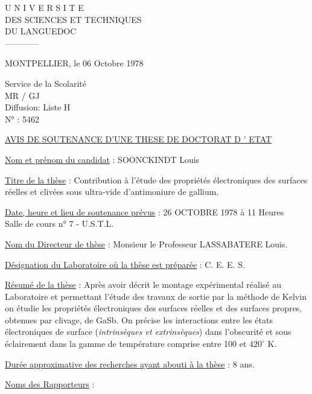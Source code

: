 
\begin{center}
U N I V E R S I T E\\
DES SCIENCES ET TECHNIQUES\\
DU LANGUEDOC\\
------------
\end{center}

MONTPELLIER, le 06 Octobre 1978

Service de la Scolarité\\
MR / GJ\\
Diffusion\quad : Liste H\\
N° : 5462

\begin{center}
\uline{AVIS DE SOUTENANCE D'UNE THESE DE DOCTORAT D ' ETAT}
\end{center}

\uline{Nom et prénom du candidat} : SOONCKINDT Louis

\uline{Titre de la thèse} : Contribution à l'étude des propriétés électroniques des surfaces réelles et clivées sous ultra-vide d'antimoniure de gallium.

\uline{Date, heure et lieu de soutenance prévus} : 26 OCTOBRE 1978 à 11 Heures\\
Salle de cours n° 7 - U.S.T.L.

\uline{Nom du Directeur de thèse} : Monsieur le Professeur LASSABATERE Louis.

\uline{Désignation du Laboratoire où la thèse est préparée} : C. E. E. S.

\uline{Résumé de la thèse} : Après avoir décrit le montage expérimental réalisé au Laboratoire et permettant l'étude des travaux de sortie par la méthode de Kelvin on étudie les propriétés électroniques des surfaces réelles et des surfaces propres, obtenues par clivage, de GaSb. On précise les interactions entre les états électroniques de surface (\textit{intrinsèques et extrinsèques}) dans l'obscurité et sous éclairement dans la gamme de température comprise entre 100 et $420^\circ$ K.

\uline{Durée approximative des recherches ayant abouti à la thèse} : 8 ans.

\uline{Noms des Rapporteurs} :


